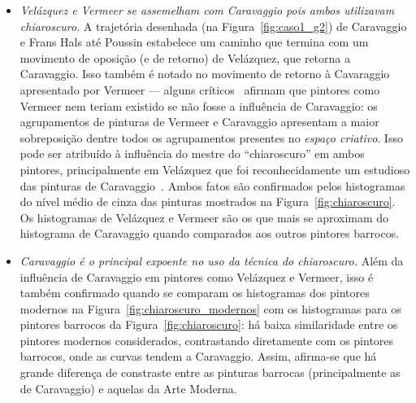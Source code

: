 \begin{itemize}
  \item \textit{Velázquez e Vermeer se assemelham com Caravaggio pois
    ambos utilizavam \textit{chiaroscuro}}. A trajetória desenhada (na
    Figura~\ref{fig:caso1_g2}) de Caravaggio e Frans Hals até Poussin
    estabelece um caminho que termina com um movimento de oposição (e
    de retorno) de Vel\'{a}zquez, que retorna a Caravaggio.  Isso
    também é notado no movimento de retorno à Cavaraggio apresentado
    por Vermeer --- alguns críticos~\cite{lambert} afirmam que
    pintores como Vermeer nem teriam existido se não fosse a
    influência de Caravaggio: os agrupamentos de pinturas de Vermeer e
    Caravaggio apresentam a maior sobreposição dentre todos os
    agrupamentos presentes no \textit{espaço criativo}. Isso pode ser
    atribuído à influência do mestre do ``chiaroscuro'' em ambos
    pintores, principalmente em Vel\'{a}zquez que foi reconhecidamente
    um estudioso das pinturas de Caravaggio~\cite{gombrich}. Ambos
    fatos são confirmados pelos histogramas do nível médio de cinza
    das pinturas mostrados na Figura~\ref{fig:chiaroscuro}. Os
    histogramas de Velázquez e Vermeer são os que mais se aproximam do
    histograma de Caravaggio quando comparados aos outros pintores
    barrocos.

    \item \textit{Caravaggio é o principal expoente no uso da técnica
      do \textit{chiaroscuro}.} Além da influência de Caravaggio em
      pintores como Velázquez e Vermeer, isso é também confirmado
      quando se comparam os histogramas dos pintores modernos na
      Figura~\ref{fig:chiaroscuro_modernos} com os histogramas para os
      pintores barrocos da Figura~\ref{fig:chiaroscuro}: há baixa
      similaridade entre os pintores modernos considerados,
      contrastando diretamente com os pintores barrocos, onde as
      curvas tendem a Caravaggio. Assim, afirma-se que há grande
      diferença de constraste entre as pinturas barrocas
      (principalmente as de Caravaggio) e aquelas da Arte Moderna.
\end{itemize}

